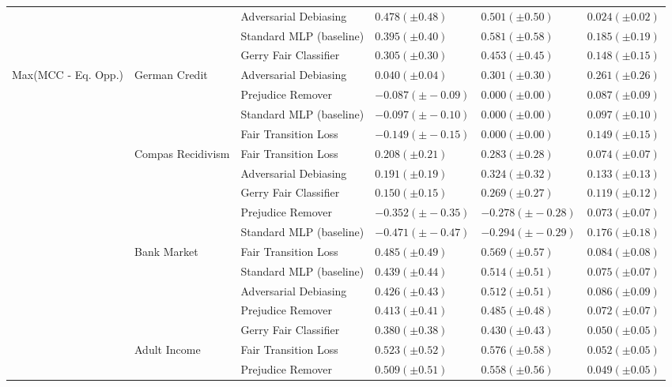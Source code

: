 \begin{tabular}{llllll}
 &  & Adversarial Debiasing & $0.478 (\pm0.48)$ & $0.501 (\pm0.50)$ & $0.024 (\pm0.02)$ \\
 &  & Standard MLP (baseline) & $0.395 (\pm0.40)$ & $0.581 (\pm0.58)$ & $0.185 (\pm0.19)$ \\
 &  & Gerry Fair Classifier & $0.305 (\pm0.30)$ & $0.453 (\pm0.45)$ & $0.148 (\pm0.15)$ \\
\cline{1-6} \cline{2-6}
\multirow[t]{19}{*}{Max(MCC - Eq. Opp.)} & \multirow[t]{4}{*}{German Credit} & Adversarial Debiasing & $0.040 (\pm0.04)$ & $0.301 (\pm0.30)$ & $0.261 (\pm0.26)$ \\
 &  & Prejudice Remover & $-0.087 (\pm-0.09)$ & $0.000 (\pm0.00)$ & $0.087 (\pm0.09)$ \\
 &  & Standard MLP (baseline) & $-0.097 (\pm-0.10)$ & $0.000 (\pm0.00)$ & $0.097 (\pm0.10)$ \\
 &  & Fair Transition Loss & $-0.149 (\pm-0.15)$ & $0.000 (\pm0.00)$ & $0.149 (\pm0.15)$ \\
\cline{2-6}
 & \multirow[t]{5}{*}{Compas Recidivism} & Fair Transition Loss & $0.208 (\pm0.21)$ & $0.283 (\pm0.28)$ & $0.074 (\pm0.07)$ \\
 &  & Adversarial Debiasing & $0.191 (\pm0.19)$ & $0.324 (\pm0.32)$ & $0.133 (\pm0.13)$ \\
 &  & Gerry Fair Classifier & $0.150 (\pm0.15)$ & $0.269 (\pm0.27)$ & $0.119 (\pm0.12)$ \\
 &  & Prejudice Remover & $-0.352 (\pm-0.35)$ & $-0.278 (\pm-0.28)$ & $0.073 (\pm0.07)$ \\
 &  & Standard MLP (baseline) & $-0.471 (\pm-0.47)$ & $-0.294 (\pm-0.29)$ & $0.176 (\pm0.18)$ \\
\cline{2-6}
 & \multirow[t]{5}{*}{Bank Market} & Fair Transition Loss & $0.485 (\pm0.49)$ & $0.569 (\pm0.57)$ & $0.084 (\pm0.08)$ \\
 &  & Standard MLP (baseline) & $0.439 (\pm0.44)$ & $0.514 (\pm0.51)$ & $0.075 (\pm0.07)$ \\
 &  & Adversarial Debiasing & $0.426 (\pm0.43)$ & $0.512 (\pm0.51)$ & $0.086 (\pm0.09)$ \\
 &  & Prejudice Remover & $0.413 (\pm0.41)$ & $0.485 (\pm0.48)$ & $0.072 (\pm0.07)$ \\
 &  & Gerry Fair Classifier & $0.380 (\pm0.38)$ & $0.430 (\pm0.43)$ & $0.050 (\pm0.05)$ \\
\cline{2-6}
 & \multirow[t]{5}{*}{Adult Income} & Fair Transition Loss & $0.523 (\pm0.52)$ & $0.576 (\pm0.58)$ & $0.052 (\pm0.05)$ \\
 &  & Prejudice Remover & $0.509 (\pm0.51)$ & $0.558 (\pm0.56)$ & $0.049 (\pm0.05)$ \\

\end{tabular}
